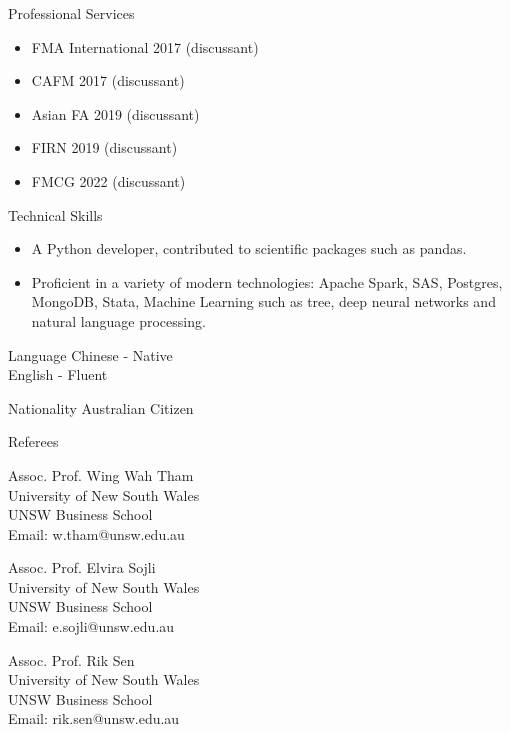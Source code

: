 \documentclass{resume} %
\begin{document}
\begin{rSection}{Professional Services}
	\begin{itemize}
		\item FMA International 2017 (discussant)
		\item CAFM 2017 (discussant)
		\item Asian FA 2019 (discussant)
		\item FIRN 2019 (discussant)
		\item FMCG 2022 (discussant)
	\end{itemize}
\end{rSection}

\begin{rSection}{Technical Skills}
	\begin{itemize}
		\item A Python developer, contributed to scientific packages such as pandas.
		\item Proficient in a variety of modern technologies: Apache Spark, SAS, Postgres, MongoDB, Stata, Machine Learning such as tree, deep neural networks and natural language processing.
	\end{itemize}
\end{rSection}

\begin{rSection}{Language}
	Chinese - Native\\
	English - Fluent
\end{rSection}

\begin{rSection}{Nationality}
	Australian Citizen
\end{rSection}

\begin{rSection}{Referees} \itemsep -3pt
	\begin{multicols}{2}
		Assoc. Prof. Wing Wah Tham\\
		University of New South Wales\\
		UNSW Business School\\
		Email: w.tham@unsw.edu.au

		Assoc. Prof. Elvira Sojli\\
		University of New South Wales\\
		UNSW Business School\\
		Email: e.sojli@unsw.edu.au\\
		\columnbreak

		Assoc. Prof. Rik Sen\\
		University of New South Wales\\
		UNSW Business School\\
		Email: rik.sen@unsw.edu.au
	\end{multicols}

\end{rSection}
\end{document}
